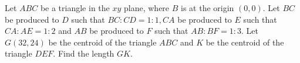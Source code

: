 Let $A B C$ be a triangle in the $x y$ plane, where $B$ is at the origin $(0,0)$. Let $B C$ be produced to $D$ such that $B C: C D=1: 1, C A$ be produced to $E$ such that $C A: A E=1: 2$ and $A B$ be produced to $F$ such that $A B: B F=1: 3$. Let $G(32,24)$ be the centroid of the triangle $A B C$ and $K$ be the centroid of the triangle $D E F$. Find the length $G K$.

